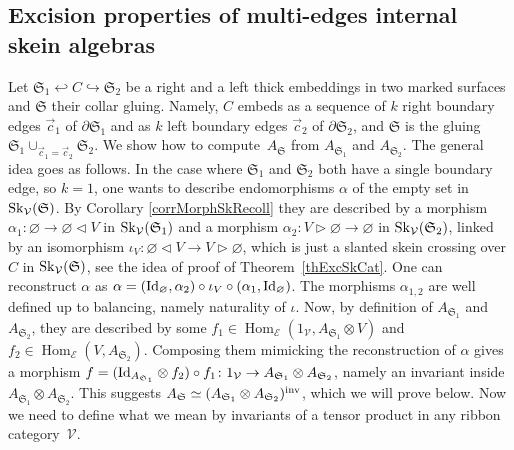 \documentclass[pdftex]{sigma}%
\numberwithin{equation}{section}
\newcommand{\Hom}{\operatorname{Hom}}
\begin{document}
\subsection{Excision properties of multi-edges internal skein algebras} Let $\mathfrak{S}_1 \hookleftarrow C \hookrightarrow \mathfrak{S}_2$ be a right and a left thick embeddings in two marked surfaces and $\mathfrak{S}$ their collar gluing. Namely, $C$ embeds as a sequence of $k$ right boundary edges $\vec{c}_1$ of $\partial \mathfrak{S}_1$ and as $k$ left boundary edges $\vec{c}_2$ of $\partial \mathfrak{S}_2$, and $\mathfrak{S}$ is the gluing $\mathfrak{S}_1 \cup_{\vec{c}_1 = \vec{c}_2} \mathfrak{S}_2$. We show how to compute~$A_\mathfrak{S}$ from $A_{\mathfrak{S}_1}$ and $A_{\mathfrak{S}_2}$.
The general idea goes as follows. In the case where $\mathfrak{S}_1$ and $\mathfrak{S}_2$ both have a single boundary edge, so $k=1$, one wants to describe endomorphisms $\alpha$ of the empty set in ${\rm Sk}_\mathcal{V}(\mathfrak{S})$. By Corollary \ref{corrMorphSkRecoll} they are described by a morphism $\alpha_1\colon \varnothing \to \varnothing \lhd V$ in ${\rm Sk}_\mathcal{V}(\mathfrak{S}_1)$ and a morphism $\alpha_2\colon V \rhd \varnothing \to \varnothing$ in ${\rm Sk}_\mathcal{V}(\mathfrak{S}_2)$, linked by an isomorphism $\iota_V \colon \varnothing \lhd V \to V \rhd \varnothing$, which is just a slanted skein crossing over $C$ in ${\rm Sk}_\mathcal{V}(\mathfrak{S})$, see the idea of proof of Theorem~\ref{thExcSkCat}. One can reconstruct $\alpha$ as $\alpha = ({\rm Id}_\varnothing , \alpha_2) \circ \iota_V \circ (\alpha_1 , {\rm Id}_\varnothing)$. The morphisms $\alpha_{1,2}$ are well defined up to balancing, namely naturality of $\iota$. Now, by definition of $A_{\mathfrak{S}_1}$ and $A_{\mathfrak{S}_2}$, they are described by some $f_1 \in \Hom_{\mathcal{E}}(1_\mathcal{V},A_{\mathfrak{S}_1}\otimes V)$ and $f_2\in\Hom_\mathcal{E}(V,A_{\mathfrak{S}_2})$. Composing them mimicking the reconstruction of $\alpha$ gives a morphism $f=({\rm Id}_{A_{\mathfrak{S}_1}}\otimes f_2)\circ f_1\colon 1_\mathcal{V} \to A_{\mathfrak{S}_1}\otimes A_{\mathfrak{S}_2}$, namely an invariant inside $A_{\mathfrak{S}_1}\otimes A_{\mathfrak{S}_2}$. This suggests $A_\mathfrak{S} \simeq (A_{\mathfrak{S}_1}\otimes A_{\mathfrak{S}_2})^{{\rm inv}}$, which we will prove below.
Now we need to define what we mean by invariants of a tensor product in any ribbon category~$\mathcal{V}$.
\end{document}
